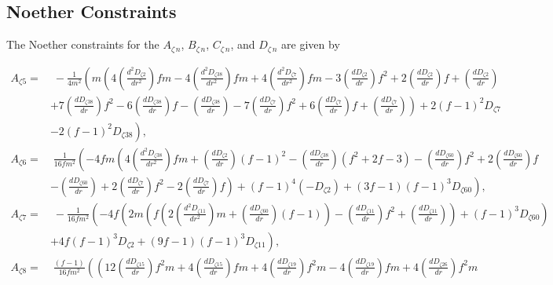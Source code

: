 \documentclass[10pt,twocolumn,preprintnumbers,amsmath,amssymb,nofootinbib
,superscriptaddress]{revtex4-1}
\begin{document}
{{{\subsection{Noether Constraints}\label{appendixVTNC}
The Noether constraints for the $A_{\zeta\,n}$, $B_{\zeta\,n}$, $C_{\zeta\,n}$, and $D_{\zeta\,n}$ are given by
\begin{widetext}
\begin{align}
A_{\zeta5}=&\;-\frac{1}{4 m^2}\left(m \left(4 \left(\frac{d^2D_{\zeta2}}{dr^2}\right) f m-4 \left(\frac{d^2D_{\zeta38}}{dr^2}\right) f m+4 \left(\frac{d^2D_{\zeta7}}{dr^2}\right) f m-3 \left(\frac{dD_{\zeta2}}{dr}\right)
 f^2+2 \left(\frac{dD_{\zeta2}}{dr}\right) f+\left(\frac{dD_{\zeta2}}{dr}\right)\right.\right.\nonumber\\
 &\left.\left.+7 \left(\frac{dD_{\zeta38}}{dr}\right) f^2-6 \left(\frac{dD_{\zeta38}}{dr}\right) f-\left(\frac{dD_{\zeta38}}{dr}\right)-7
 \left(\frac{dD_{\zeta7}}{dr}\right) f^2+6 \left(\frac{dD_{\zeta7}}{dr}\right) f+\left(\frac{dD_{\zeta7}}{dr}\right)\right)+2 (f-1)^2 D_{\zeta7}\right.\nonumber\\
 &\left.-2(f-1)^2 D_{\zeta38}\right),\nonumber\\
A_{\zeta6}=&\;\frac{1}{16 f m^2}\left(-4 f m \left(4 \left(\frac{d^2D_{\zeta38}}{dr^2}\right) f m+\left(\frac{dD_{\zeta2}}{dr}\right) (f-1)^2-\left(\frac{dD_{\zeta38}}{dr}\right) \left(f^2+2
 f-3\right)-\left(\frac{dD_{\zeta60}}{dr}\right) f^2+2 \left(\frac{dD_{\zeta60}}{dr}\right) f\right.\right.\nonumber\\
 &\left.\left.-\left(\frac{dD_{\zeta60}}{dr}\right)+2 \left(\frac{dD_{\zeta7}}{dr}\right) f^2-2
 \left(\frac{dD_{\zeta7}}{dr}\right) f\right)+(f-1)^4 (-D_{\zeta2})+(3 f-1) (f-1)^3
 D_{\zeta60}\right),\nonumber\\ 
 A_{\zeta7}=&\;-\frac{1}{16 f m^2}\left(-4 f \left(2 m \left(f (2 \left(\frac{d^2D_{\zeta11}}{dr^2}\right) m+\left(\frac{dD_{\zeta60}}{dr}\right) (f-1))-\left(\frac{dD_{\zeta11}}{dr}\right)
 f^2+\left(\frac{dD_{\zeta11}}{dr}\right)\right)+(f-1)^3 D_{\zeta60}\right)\right.\nonumber\\
 &\left.+4 f (f-1)^3
 D_{\zeta2}+(9 f-1) (f-1)^3 D_{\zeta11}\right), \nonumber\\
 A_{\zeta8}=&\;\frac{(f-1)}{16
 f m^2}\left( \left(12 \left(\frac{dD_{\zeta15}}{dr}\right) f^2 m+4 \left(\frac{dD_{\zeta15}}{dr}\right) f m+4 \left(\frac{dD_{\zeta19}}{dr}\right) f^2 m-4
 \left(\frac{dD_{\zeta19}}{dr}\right) f m+4 \left(\frac{dD_{\zeta26}}{dr}\right) f^2 m\right.\right.\nonumber\\

\end{align}
\end{widetext}}}}
\end{document}

